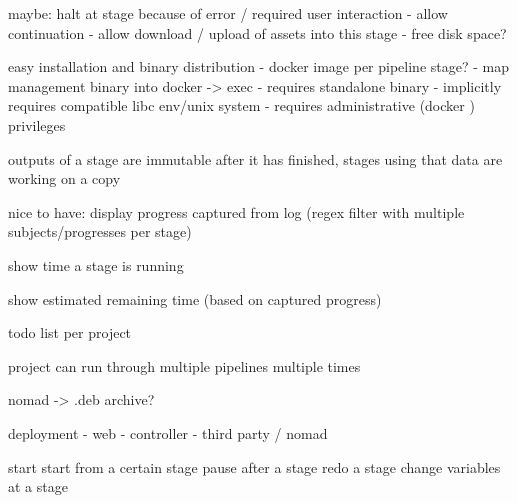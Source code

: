 maybe: halt at stage because of error / required user interaction
- allow continuation
- allow download / upload of assets into this stage
- free disk space?


easy installation and binary distribution
- docker image per pipeline stage?
- map management binary into docker -> exec
- requires standalone binary
- implicitly requires compatible libc env/unix system
- requires administrative (docker ) privileges


outputs of a stage are immutable after it has finished, stages using that data are working on a copy

nice to have: display progress captured from log (regex filter with multiple subjects/progresses per stage)

show time a stage is running

show estimated remaining time (based on captured progress)

todo list per project

project can run through multiple pipelines multiple times

nomad -> .deb archive?

deployment
- web
- controller
- third party / nomad

start
start from a certain stage
pause after a stage
redo a stage
change variables at a stage